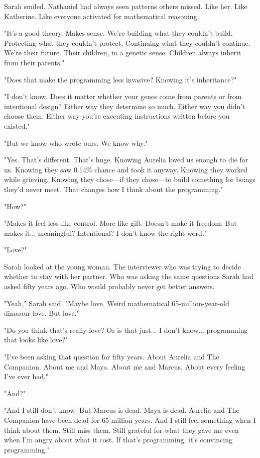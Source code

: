 Sarah smiled. Nathaniel had always seen patterns others missed. Like her. Like Katherine. Like everyone activated for mathematical reasoning.

"It's a good theory. Makes sense. We're building what they couldn't build. Protecting what they couldn't protect. Continuing what they couldn't continue. We're their future. Their children, in a genetic sense. Children always inherit from their parents."

"Does that make the programming less invasive? Knowing it's inheritance?"

"I don't know. Does it matter whether your genes come from parents or from intentional design? Either way they determine so much. Either way you didn't choose them. Either way you're executing instructions written before you existed."

"But we know who wrote ours. We know why."

"Yes. That's different. That's huge. Knowing Aurelia loved us enough to die for us. Knowing they saw 0.14\% chance and took it anyway. Knowing they worked while grieving. Knowing they chose—if they chose—to build something for beings they'd never meet. That changes how I think about the programming."

"How?"

"Makes it feel less like control. More like gift. Doesn't make it freedom. But makes it... meaningful? Intentional? I don't know the right word."

"Love?"

Sarah looked at the young woman. The interviewer who was trying to decide whether to stay with her partner. Who was asking the same questions Sarah had asked fifty years ago. Who would probably never get better answers.

"Yeah," Sarah said. "Maybe love. Weird mathematical 65-million-year-old dinosaur love. But love."

"Do you think that's really love? Or is that just... I don't know... programming that looks like love?"

"I've been asking that question for fifty years. About Aurelia and The Companion. About me and Maya. About me and Marcus. About every feeling I've ever had."

"And?"

"And I still don't know. But Marcus is dead. Maya is dead. Aurelia and The Companion have been dead for 65 million years. And I still feel something when I think about them. Still miss them. Still grateful for what they gave me even when I'm angry about what it cost. If that's programming, it's convincing programming."

